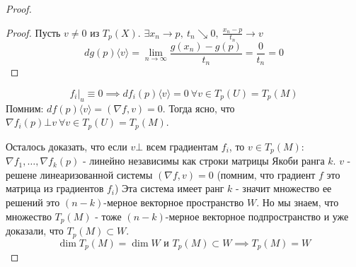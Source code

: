 \begin{theorem}
\begin{proof}
\begin{lemma*}
            \begin{proof}
                Пусть $v \neq 0$ из $T_p(X)$. $\exists x_n \to p, \ t_n \searrow 0, \ \frac{x_n - p}{t_n} \to v$
                \[dg(p)\langle v \rangle = \lim_{n \to \infty} \frac{g(x_n) - g(p)}{t_n} = \frac{0}{t_n} = 0\]
            \end{proof}
        \end{lemma*}

        \[f_i|_u \equiv 0 \implies df_i(p)\langle v \rangle = 0 \ \forall v \in T_p(U) = T_p(M)\]
        Помним: $df(p)\langle v \rangle = (\nabla f, v) = 0$. Тогда ясно, что $\nabla f_i(p) \bot v \ \forall v \in T_p(U) = T_p(M)$.
        \par
        Осталось доказать, что если $v \bot$ всем градиентам $f_i$, то $v \in T_p(M)$: \\
        $\nabla f_1, \hdots, \nabla f_k(p)$ - линейно независимы как строки матрицы Якоби ранга $k$. $v$ - решене линеаризованной системы $(\nabla f, v) = 0$ (помним, что градиент $f$ это матрица из градиентов $f_i$)
        Эта система имеет ранг $k$ - значит множество ее решений это $(n-k)$-мерное векторное пространство $W$. Но мы знаем, что множество
        $T_p(M)$ - тоже $(n-k)$-мерное векторное подпространство и уже доказали, что $T_p(M) \subset W$. 
        \[\dim T_p(M) = \dim W \text{ и } T_p(M) \subset W \implies T_p(M) = W\]
    \end{proof}

\end{theorem}